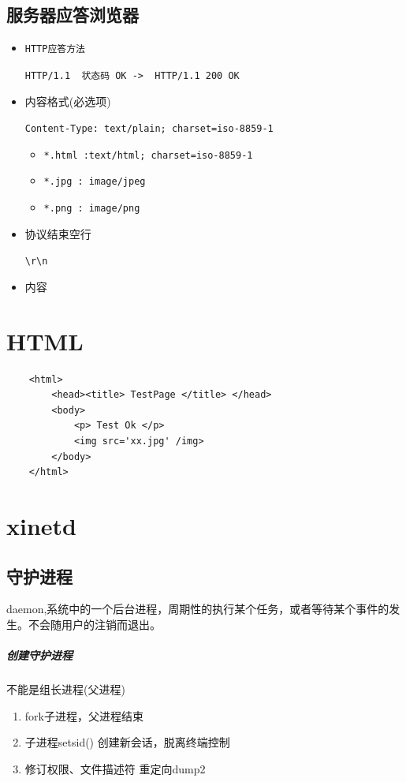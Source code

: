 \documentclass[UTF8,a4paper,8pt]{ctexbook}
\begin{document}
		\subsection{服务器应答浏览器}
			\begin{itemize}
				\item \verb|HTTP应答方法| 
				
				\verb|HTTP/1.1  状态码 OK ->  HTTP/1.1 200 OK|
				\item 内容格式(必选项)
				
				\verb|Content-Type: text/plain; charset=iso-8859-1|
					\begin{itemize}
						\item \verb|*.html :text/html; charset=iso-8859-1| 
						\item \verb|*.jpg : image/jpeg|
						\item \verb|*.png : image/png|
					\end{itemize}
				\item 协议结束空行
				
				\verb|\r\n|
				\item 内容
			\end{itemize}
	\section{HTML}
		\begin{lstlisting}
	<html>
		<head><title> TestPage </title> </head>
		<body>
			<p> Test Ok </p>
			<img src='xx.jpg' /img>
		</body>
	</html>
		\end{lstlisting}	
	
	\section{xinetd}
		\subsection{守护进程}
			daemon,系统中的一个后台进程，周期性的执行某个任务，或者等待某个事件的发生。不会随用户的注销而退出。
			
			\subparagraph{创建守护进程} 不能是组长进程(父进程)
				\begin{enumerate}[itemindent = 2em]
					\item fork子进程，父进程结束
					\item 子进程setsid() 创建新会话，脱离终端控制
					\item 修订权限、文件描述符 重定向dump2
				\end{enumerate}
		
\end{document}
